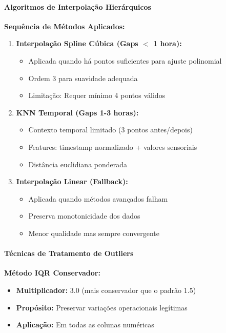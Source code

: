 \paragraph{Algoritmos de Interpolação Hierárquicos}

\textbf{Sequência de Métodos Aplicados:}

\begin{enumerate}
    \item \textbf{Interpolação Spline Cúbica (Gaps $<$ 1 hora):}
    \begin{itemize}
        \item Aplicada quando há pontos suficientes para ajuste polinomial
        \item Ordem 3 para suavidade adequada
        \item Limitação: Requer mínimo 4 pontos válidos
    \end{itemize}

    \item \textbf{KNN Temporal (Gaps 1-3 horas):}
    \begin{itemize}
        \item Contexto temporal limitado (3 pontos antes/depois)
        \item Features: timestamp normalizado + valores sensoriais
        \item Distância euclidiana ponderada
    \end{itemize}

    \item \textbf{Interpolação Linear (Fallback):}
    \begin{itemize}
        \item Aplicada quando métodos avançados falham
        \item Preserva monotonicidade dos dados
        \item Menor qualidade mas sempre convergente
    \end{itemize}
\end{enumerate}

\paragraph{Técnicas de Tratamento de Outliers}

\textbf{Método IQR Conservador:}
\begin{itemize}
    \item \textbf{Multiplicador:} 3.0 (mais conservador que o padrão 1.5)
    \item \textbf{Propósito:} Preservar variações operacionais legítimas
    \item \textbf{Aplicação:} Em todas as colunas numéricas
\end{itemize}

